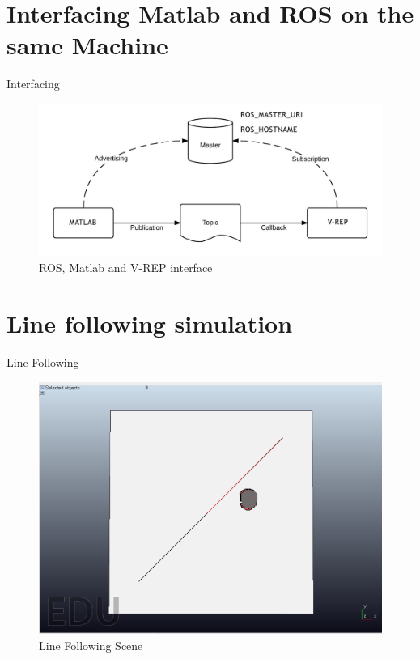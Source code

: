 \documentclass{beamer}
\begin{document}
\section{Interfacing Matlab and ROS on the same Machine}
\begin{frame}{Interfacing}
\begin{figure}
\includegraphics[scale=0.2]{figs/img/interface.jpg}
\caption{ROS, Matlab and V-REP interface}
\end{figure}
\end{frame}
\section{Line following simulation}
\begin{frame}{Line Following}
\begin{center}
\begin{figure}
\includegraphics[scale=0.25]{figs/img/line.png}
\caption{Line Following Scene}
\end{figure}
\end{center}

\end{frame}
\end{document}
